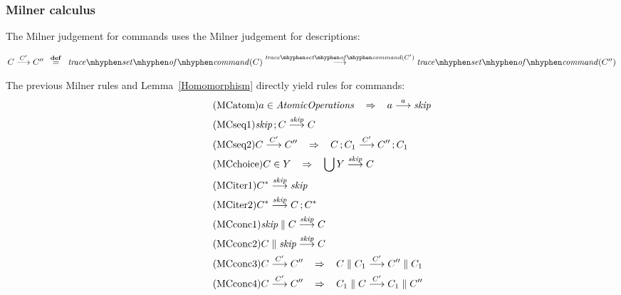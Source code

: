 \documentclass[a4paper,leqno]{llncs}
\newcommand{\mybox}[1]{\ensuremath{\text{\mbox{\ensuremath{#1}}}}}
\newcommand{\spacedwith}[2]{\ensuremath{\phantom{#2}#1\phantom{#2}}}
\newcommand{\spaced}[1]{\spacedwith{#1}{m}}
\newcommand{\defn}{\spacedwith{\stackrel{\mathbf{def}}{=}}{o}}
\newcommand{\askip}{\ensuremath{\textit{skip}}}
\newcommand{\asemicolon}{\ensuremath{\,;}}
\newcommand{\alub}{\ensuremath{\bigcup}}
\newcommand{\astar}{\ensuremath{\parallel}}
\newcommand{\kleene}[1]{\ensuremath{{#1}^*}}
\newcommand{\milner}[3]{\mybox{{#1}\stackrel{#2}{\longrightarrow}{#3}}}
\newcommand{\AtomicOperations}{\mybox{\mathit{AtomicOperations}}}
\newcommand{\traceSetOfCommand}[1]{\ensuremath{\mathit{trace\mhyphen set\mhyphen of\mhyphen command}(#1)}}
\newcommand{\simplies}{\spaced{\Rightarrow}}
\newcommand{\rulename}[1]{\tag{#1}\label{#1}}
\newcommand{\BEGINMYDEF}{\begin{trivlist}\item}
\newcommand{\ENDMYDEF}{\end{trivlist}}
\begin{document}
\subsubsection{Milner calculus}
The Milner judgement for commands uses the Milner judgement for descriptions:
\BEGINMYDEF
$\milner{C}{C^\prime}{C^{\prime\prime}} \defn \milner{\traceSetOfCommand{C}}{\traceSetOfCommand{C^\prime}}{\traceSetOfCommand{C^{\prime\prime}}}$
\ENDMYDEF
The previous Milner rules and Lemma~\ref{Homomorphism} directly yield rules for commands:
\begin{align}
&\rulename{MCatom} a \in \AtomicOperations \simplies \milner{a}{a}{\askip} \\
&\rulename{MCseq1} \milner{\askip \asemicolon C}{\askip}{C} \\
&\rulename{MCseq2} \milner{C}{C^\prime}{C^{\prime\prime}} \simplies \milner{C \asemicolon C_1}{C^\prime}{C^{\prime\prime} \asemicolon C_1} \\
&\rulename{MCchoice} C \in Y \simplies \milner{\alub Y}{\askip}{C} \\
&\rulename{MCiter1} \milner{\kleene{C}}{\askip}{\askip} \\
&\rulename{MCiter2} \milner{\kleene{C}}{\askip}{C \asemicolon \kleene{C}} \\
&\rulename{MCconc1} \milner{\askip \astar C}{\askip}{C} \\
&\rulename{MCconc2} \milner{C \astar \askip}{\askip}{C} \\
&\rulename{MCconc3} \milner{C}{C^\prime}{C^{\prime\prime}} \simplies \milner{C \astar C_1}{C^\prime}{C^{\prime\prime} \astar C_1} \\
&\rulename{MCconc4} \milner{C}{C^\prime}{C^{\prime\prime}} \simplies \milner{C_1 \astar C}{C^\prime}{C_1 \astar C^{\prime\prime}}
\end{align}
\end{document}
